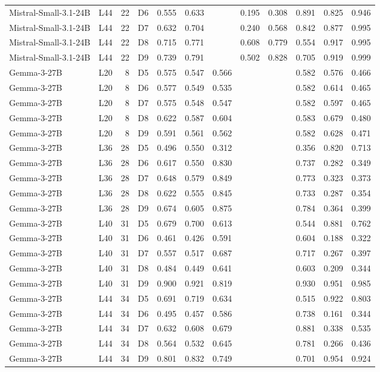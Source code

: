 \begin{table}
\begin{tabular}{llrlrrrrrrrr}
Mistral-Small-3.1-24B & L44 & 22 & D6 & 0.555 & 0.633 &  & 0.195 & 0.308 & 0.891 & 0.825 & 0.946 \\
Mistral-Small-3.1-24B & L44 & 22 & D7 & 0.632 & 0.704 &  & 0.240 & 0.568 & 0.842 & 0.877 & 0.995 \\
Mistral-Small-3.1-24B & L44 & 22 & D8 & 0.715 & 0.771 &  & 0.608 & 0.779 & 0.554 & 0.917 & 0.995 \\
Mistral-Small-3.1-24B & L44 & 22 & D9 & 0.739 & 0.791 &  & 0.502 & 0.828 & 0.705 & 0.919 & 0.999 \\
Gemma-3-27B & L20 & 8 & D5 & 0.575 & 0.547 & 0.566 &  &  & 0.582 & 0.576 & 0.466 \\
Gemma-3-27B & L20 & 8 & D6 & 0.577 & 0.549 & 0.535 &  &  & 0.582 & 0.614 & 0.465 \\
Gemma-3-27B & L20 & 8 & D7 & 0.575 & 0.548 & 0.547 &  &  & 0.582 & 0.597 & 0.465 \\
Gemma-3-27B & L20 & 8 & D8 & 0.622 & 0.587 & 0.604 &  &  & 0.583 & 0.679 & 0.480 \\
Gemma-3-27B & L20 & 8 & D9 & 0.591 & 0.561 & 0.562 &  &  & 0.582 & 0.628 & 0.471 \\
Gemma-3-27B & L36 & 28 & D5 & 0.496 & 0.550 & 0.312 &  &  & 0.356 & 0.820 & 0.713 \\
Gemma-3-27B & L36 & 28 & D6 & 0.617 & 0.550 & 0.830 &  &  & 0.737 & 0.282 & 0.349 \\
Gemma-3-27B & L36 & 28 & D7 & 0.648 & 0.579 & 0.849 &  &  & 0.773 & 0.323 & 0.373 \\
Gemma-3-27B & L36 & 28 & D8 & 0.622 & 0.555 & 0.845 &  &  & 0.733 & 0.287 & 0.354 \\
Gemma-3-27B & L36 & 28 & D9 & 0.674 & 0.605 & 0.875 &  &  & 0.784 & 0.364 & 0.399 \\
Gemma-3-27B & L40 & 31 & D5 & 0.679 & 0.700 & 0.613 &  &  & 0.544 & 0.881 & 0.762 \\
Gemma-3-27B & L40 & 31 & D6 & 0.461 & 0.426 & 0.591 &  &  & 0.604 & 0.188 & 0.322 \\
Gemma-3-27B & L40 & 31 & D7 & 0.557 & 0.517 & 0.687 &  &  & 0.717 & 0.267 & 0.397 \\
Gemma-3-27B & L40 & 31 & D8 & 0.484 & 0.449 & 0.641 &  &  & 0.603 & 0.209 & 0.344 \\
Gemma-3-27B & L40 & 31 & D9 & 0.900 & 0.921 & 0.819 &  &  & 0.930 & 0.951 & 0.985 \\
Gemma-3-27B & L44 & 34 & D5 & 0.691 & 0.719 & 0.634 &  &  & 0.515 & 0.922 & 0.803 \\
Gemma-3-27B & L44 & 34 & D6 & 0.495 & 0.457 & 0.586 &  &  & 0.738 & 0.161 & 0.344 \\
Gemma-3-27B & L44 & 34 & D7 & 0.632 & 0.608 & 0.679 &  &  & 0.881 & 0.338 & 0.535 \\
Gemma-3-27B & L44 & 34 & D8 & 0.564 & 0.532 & 0.645 &  &  & 0.781 & 0.266 & 0.436 \\
Gemma-3-27B & L44 & 34 & D9 & 0.801 & 0.832 & 0.749 &  &  & 0.701 & 0.954 & 0.924 \\
\bottomrule
\end{tabular}
\end{table}
